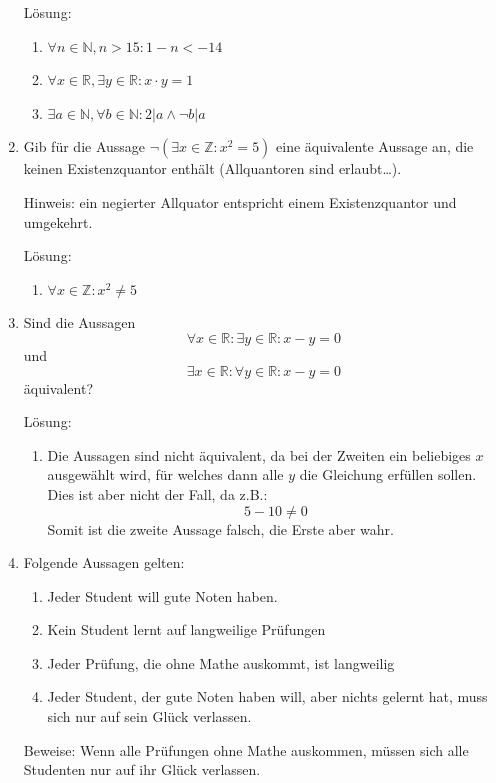 \documentclass[../main.tex]{subfiles}
\begin{document}
\begin{enumerate}
	      Lösung:
	      \begin{enumerate}
		      \item \( \forall n \in \mathbb{N}, n > 15 : 1 - n < -14 \)
		      \item \( \forall x \in \mathbb{R}, \exists y \in \mathbb{R} : x \cdot y = 1 \)
		      \item \( \exists a \in \mathbb{N}, \forall b \in \mathbb{N} : 2 | a \land \neg b | a \)
	      \end{enumerate}
	\item Gib für die Aussage \( \neg (\exists x \in \mathbb{Z} : x^2 = 5) \) eine äquivalente Aussage an, die keinen Existenzquantor enthält
	      (Allquantoren sind erlaubt\dots).

	      Hinweis: ein negierter Allquator entspricht einem Existenzquantor und umgekehrt.

	      Lösung:
	      \begin{enumerate}
		      \item \( \forall x \in \mathbb{Z} : x^2 \neq 5 \)
	      \end{enumerate}
	\item Sind die Aussagen
	      \[ \forall x \in \mathbb{R} : \exists y \in \mathbb{R} : x - y = 0 \]
	      und
	      \[ \exists x \in \mathbb{R} : \forall y \in \mathbb{R} : x - y = 0 \]
	      äquivalent?

	      Lösung:
	      \begin{enumerate}
		      \item Die Aussagen sind nicht äquivalent, da bei der Zweiten ein beliebiges \( x \) ausgewählt wird,
		            für welches dann alle \( y \) die Gleichung erfüllen sollen. Dies ist aber nicht der Fall, da z.B.:
		            \[ 5 - 10 \neq 0 \]
		            Somit ist die zweite Aussage falsch, die Erste aber wahr.
	      \end{enumerate}
	\item Folgende Aussagen gelten:
	      \begin{enumerate}
		      \item Jeder Student will gute Noten haben.
		      \item Kein Student lernt auf langweilige Prüfungen
		      \item Jeder Prüfung, die ohne Mathe auskommt, ist langweilig
		      \item Jeder Student, der gute Noten haben will, aber nichts gelernt hat,
		            muss sich nur auf sein Glück verlassen.
	      \end{enumerate}
	      Beweise: Wenn alle Prüfungen ohne Mathe auskommen, müssen sich alle Studenten nur auf ihr Glück verlassen.


\end{enumerate}
\end{document}
